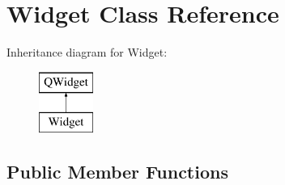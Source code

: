 \hypertarget{classWidget}{}\section{Widget Class Reference}
\label{classWidget}
Inheritance diagram for Widget\+:\begin{figure}[H]
\begin{center}
\leavevmode
\includegraphics[height=2.000000cm]{classWidget}
\end{center}
\end{figure}
\subsection*{Public Member Functions}
